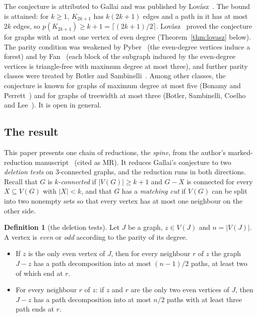 \documentclass[11pt]{amsart}
\theoremstyle{definition}
\newtheorem{definition}[theorem]{Definition}
\theoremstyle{remark}
\renewcommand{\_}{\oldunderscore\allowbreak}
\begin{document}
The conjecture is attributed to Gallai and was published by Lov\'asz~\cite{L68}. The bound is
attained: for $k\ge1$, $K_{2k+1}$ has $k(2k+1)$ edges and a path in it has at most $2k$ edges, so
$p(K_{2k+1})\ge k+1=\lceil (2k+1)/2\rceil$. Lov\'asz~\cite{L68} proved the conjecture for graphs
with at most one vertex of even degree (Theorem~\ref{thm:lovasz} below). The parity condition was
weakened by Pyber~\cite{Pyb96} (the even-degree vertices induce a forest) and by
Fan~\cite{Fan05} (each block of the subgraph induced by the even-degree vertices is triangle-free
with maximum degree at most three), and further parity classes were treated by Botler and
Sambinelli~\cite{BS21}. Among other classes, the conjecture is known for graphs of maximum degree at
most five (Bonamy and Perrett~\cite{BP19}) and for graphs of treewidth at most three (Botler,
Sambinelli, Coelho and Lee~\cite{BSCL20}). It is open in general.

\subsection*{The result}
This paper presents one chain of reductions, the \emph{spine}, from the author's marked-reduction
manuscript~\cite{MR} (cited as MR). It reduces Gallai's conjecture to two \emph{deletion tests} on
$3$-connected graphs, and the reduction runs in both directions. Recall that $G$ is
\emph{$k$-connected} if $|V(G)|\ge k+1$ and $G-X$ is connected for every $X\subseteq V(G)$ with
$|X|<k$, and that $G$ has a \emph{matching cut} if $V(G)$ can be split into two nonempty sets so
that every vertex has at most one neighbour on the other side.

\begin{definition}[the deletion tests]\label{def:tests}
Let $J$ be a graph, $z\in V(J)$ and $n=|V(J)|$. A vertex is \emph{even} or \emph{odd} according to
the parity of its degree.
\begin{itemize}[leftmargin=3.2em]
\item[(T1)] If $z$ is the only even vertex of $J$, then for every neighbour $r$ of $z$ the graph
$J-z$ has a path decomposition into at most $(n-1)/2$ paths, at least two of which end at $r$.
\item[(T2)] For every neighbour $r$ of $z$: if $z$ and $r$ are the only two even vertices of $J$,
then $J-z$ has a path decomposition into at most $n/2$ paths with at least three path ends at $r$.
\end{itemize}
\end{definition}
\end{document}
